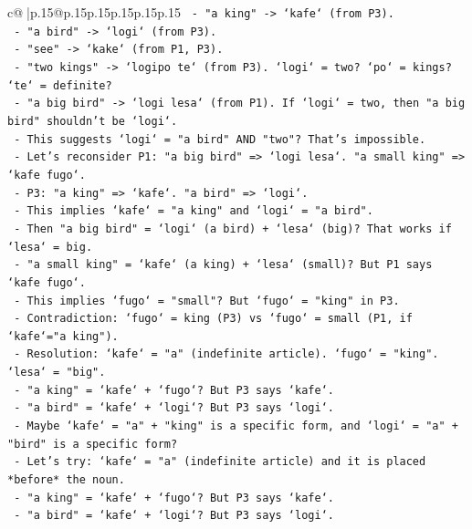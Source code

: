 \documentclass{article}
\begin{document}
{\begin{supertabular}{c@{$\;$}|p{.15\linewidth}@{}p{.15\linewidth}p{.15\linewidth}p{.15\linewidth}p{.15\linewidth}p{.15\linewidth}}
{{{\texttt{              {-} "a king" {-}> `kafe` (from P3).} \\
\texttt{              {-} "a bird" {-}> `logi` (from P3).} \\
\texttt{              {-} "see" {-}> `kake` (from P1, P3).} \\
\texttt{              {-} "two kings" {-}> `logipo te` (from P3). `logi` = two? `po` = kings? `te` = definite?} \\
\texttt{              {-} "a big bird" {-}> `logi lesa` (from P1). If `logi` = two, then "a big bird" shouldn't be `logi`.} \\
\texttt{              {-} This suggests `logi` = "a bird" AND "two"? That's impossible.} \\
\texttt{              {-} Let's reconsider P1: "a big bird" => `logi lesa`. "a small king" => `kafe fugo`.} \\
\texttt{              {-} P3: "a king" => `kafe`. "a bird" => `logi`.} \\
\texttt{              {-} This implies `kafe` = "a king" and `logi` = "a bird".} \\
\texttt{              {-} Then "a big bird" = `logi` (a bird) + `lesa` (big)? That works if `lesa` = big.} \\
\texttt{              {-} "a small king" = `kafe` (a king) + `lesa` (small)? But P1 says `kafe fugo`.} \\
\texttt{              {-} This implies `fugo` = "small"? But `fugo` = "king" in P3.} \\
\texttt{              {-} Contradiction: `fugo` = king (P3) vs `fugo` = small (P1, if `kafe`="a king").} \\
\texttt{              {-} Resolution: `kafe` = "a" (indefinite article). `fugo` = "king". `lesa` = "big".} \\
\texttt{                {-} "a king" = `kafe` + `fugo`? But P3 says `kafe`.} \\
\texttt{                {-} "a bird" = `kafe` + `logi`? But P3 says `logi`.} \\
\texttt{              {-} Maybe `kafe` = "a" + "king" is a specific form, and `logi` = "a" + "bird" is a specific form?} \\
\texttt{              {-} Let's try: `kafe` = "a" (indefinite article) and it is placed *before* the noun.} \\
\texttt{                {-} "a king" = `kafe` + `fugo`? But P3 says `kafe`.} \\
\texttt{                {-} "a bird" = `kafe` + `logi`? But P3 says `logi`.} \\
}}}
\end{supertabular}}
\end{document}
